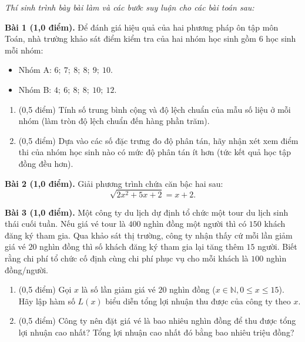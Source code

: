 \documentclass[12pt,a4paper]{article}
\newcommand{\parttitle}[1]{\par\vspace{3.5pt}\needspace{3\baselineskip}{\large\bfseries\color{ink}#1}\par\nopagebreak\vspace{2pt}}
\begin{document}
\vspace{3pt}
\parttitle{PHẦN IV. Tự luận}
\textit{Thí sinh trình bày bài làm và các bước suy luận cho các bài toán sau:}

\vspace{4pt}
\textbf{Bài 1 (1,0 điểm).} Để đánh giá hiệu quả của hai phương pháp ôn tập môn Toán, nhà trường khảo sát điểm kiểm tra của hai nhóm học sinh gồm $6$ học sinh mỗi nhóm:
\begin{itemize}[leftmargin=1.5em, itemsep=1.5pt]
    \item Nhóm A: $6;\ 7;\ 8;\ 8;\ 9;\ 10$.
    \item Nhóm B: $4;\ 6;\ 8;\ 8;\ 10;\ 12$.
\end{itemize}
\begin{enumerate}[label=\alph*), itemsep=2pt]
    \item (0,5 điểm) Tính số trung bình cộng và độ lệch chuẩn của mẫu số liệu ở mỗi nhóm (làm tròn độ lệch chuẩn đến hàng phần trăm).
    \item (0,5 điểm) Dựa vào các số đặc trưng đo độ phân tán, hãy nhận xét xem điểm thi của nhóm học sinh nào có mức độ phân tán ít hơn (tức kết quả học tập đồng đều hơn).
\end{enumerate}

\vspace{6pt}
\textbf{Bài 2 (1,0 điểm).} Giải phương trình chứa căn bậc hai sau:
$$\sqrt{2x^2 + 5x + 2} = x + 2.$$

\vspace{6pt}
\textbf{Bài 3 (1,0 điểm).} Một công ty du lịch dự định tổ chức một tour du lịch sinh thái cuối tuần. Nếu giá vé tour là $400$ nghìn đồng một người thì có $150$ khách đăng ký tham gia. Qua khảo sát thị trường, công ty nhận thấy cứ mỗi lần giảm giá vé $20$ nghìn đồng thì số khách đăng ký tham gia lại tăng thêm $15$ người. Biết rằng chi phí tổ chức cố định cùng chi phí phục vụ cho mỗi khách là $100$ nghìn đồng/người.
\begin{enumerate}[label=\alph*), itemsep=2pt]
    \item (0,5 điểm) Gọi $x$ là số lần giảm giá vé $20$ nghìn đồng ($x \in \mathbb{N}, 0 \le x \le 15$). Hãy lập hàm số $L(x)$ biểu diễn tổng lợi nhuận thu được của công ty theo $x$.
    \item (0,5 điểm) Công ty nên đặt giá vé là bao nhiêu nghìn đồng để thu được tổng lợi nhuận cao nhất? Tổng lợi nhuận cao nhất đó bằng bao nhiêu triệu đồng?
\end{enumerate}


\newpage
\pagestyle{dapan}
\setcounter{page}{1}
\end{document}
